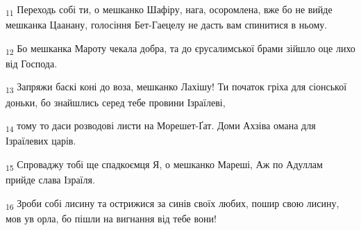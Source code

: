 \begin{tcolorbox}
\textsubscript{11} Переходь собі ти, о мешканко Шафіру, нага, осоромлена, вже бо не вийде мешканка Цаанану, голосіння Бет-Гаецелу не дасть вам спинитися в ньому.
\end{tcolorbox}
\begin{tcolorbox}
\textsubscript{12} Бо мешканка Мароту чекала добра, та до єрусалимської брами зійшло оце лихо від Господа.
\end{tcolorbox}
\begin{tcolorbox}
\textsubscript{13} Запряжи баскі коні до воза, мешканко Лахішу! Ти початок гріха для сіонської доньки, бо знайшлись серед тебе провини Ізраїлеві,
\end{tcolorbox}
\begin{tcolorbox}
\textsubscript{14} тому то даси розводові листи на Морешет-Ґат. Доми Ахзіва омана для Ізраїлевих царів.
\end{tcolorbox}
\begin{tcolorbox}
\textsubscript{15} Спроваджу тобі ще спадкоємця Я, о мешканко Мареші, Аж по Адуллам прийде слава Ізраїля.
\end{tcolorbox}
\begin{tcolorbox}
\textsubscript{16} Зроби собі лисину та острижися за синів своїх любих, пошир свою лисину, мов ув орла, бо пішли на вигнання від тебе вони!
\end{tcolorbox}
